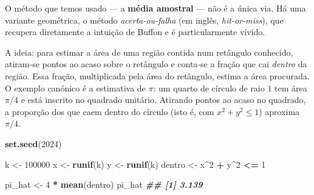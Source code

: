 \documentclass[
  portuguese,
  11pt,
  openany]{book}
\newenvironment{Shaded}{\begin{snugshade}}{\end{snugshade}}
\newcommand{\DecValTok}[1]{\textcolor[rgb]{0.00,0.00,0.81}{#1}}
\newcommand{\DocumentationTok}[1]{\textcolor[rgb]{0.56,0.35,0.01}{\textbf{\textit{#1}}}}
\newcommand{\FunctionTok}[1]{\textcolor[rgb]{0.13,0.29,0.53}{\textbf{#1}}}
\newcommand{\NormalTok}[1]{#1}
\newcommand{\OtherTok}[1]{\textcolor[rgb]{0.56,0.35,0.01}{#1}}
\newcommand{\SpecialCharTok}[1]{\textcolor[rgb]{0.81,0.36,0.00}{\textbf{#1}}}
\begin{document}
O método que temos usado --- a \textbf{média amostral} --- não é a única via. Há uma
variante geométrica, o método \emph{acerta-ou-falha} (em inglês, \emph{hit-or-miss}), que
recupera diretamente a intuição de Buffon e é particularmente vívido.

A ideia: para estimar a área de uma região contida num retângulo conhecido,
atiram-se pontos ao acaso sobre o retângulo e conta-se a fração que cai \emph{dentro}
da região. Essa fração, multiplicada pela área do retângulo, estima a área
procurada. O exemplo canónico é a estimativa de \(\pi\): um quarto de círculo de
raio \(1\) tem área \(\pi/4\) e está inscrito no quadrado unitário. Atirando pontos
ao acaso no quadrado, a proporção dos que caem dentro do círculo (isto é, com
\(x^2 + y^2 \leq 1\)) aproxima \(\pi/4\).

\begin{Shaded}
\begin{Highlighting}[]
\FunctionTok{set.seed}\NormalTok{(}\DecValTok{2024}\NormalTok{)}

\NormalTok{k }\OtherTok{\textless{}{-}} \DecValTok{100000}
\NormalTok{x }\OtherTok{\textless{}{-}} \FunctionTok{runif}\NormalTok{(k)}
\NormalTok{y }\OtherTok{\textless{}{-}} \FunctionTok{runif}\NormalTok{(k)}
\NormalTok{dentro }\OtherTok{\textless{}{-}}\NormalTok{ x}\SpecialCharTok{\^{}}\DecValTok{2} \SpecialCharTok{+}\NormalTok{ y}\SpecialCharTok{\^{}}\DecValTok{2} \SpecialCharTok{\textless{}=} \DecValTok{1}

\NormalTok{pi\_hat }\OtherTok{\textless{}{-}} \DecValTok{4} \SpecialCharTok{*} \FunctionTok{mean}\NormalTok{(dentro)}
\NormalTok{pi\_hat}
\DocumentationTok{\#\# [1] 3.139}
\end{Highlighting}
\end{Shaded}
\end{document}
